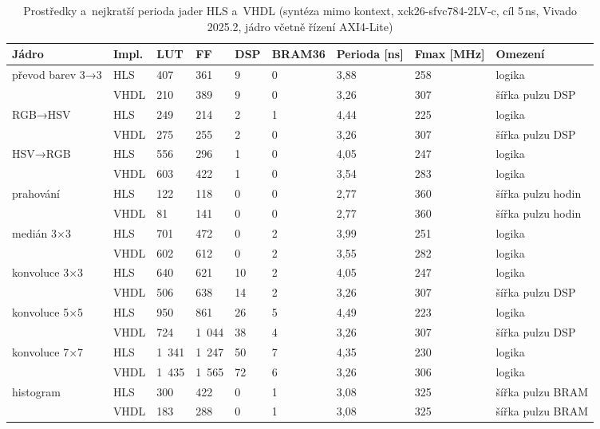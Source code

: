 \begin{table}[htbp]
    \centering
    \caption{Prostředky a~nejkratší perioda jader HLS a~VHDL (syntéza mimo kontext, xck26-sfvc784-2LV-c, cíl 5\,ns, Vivado 2025.2, jádro včetně řízení AXI4-Lite)}
    \label{tab:ooc}
    \begin{tabular}{p{2.6cm}p{1.2cm}p{1.1cm}p{1.1cm}p{1.0cm}p{1.2cm}p{1.4cm}p{1.3cm}p{2.8cm}}
        \toprule
        Jádro & Impl. & LUT & FF & DSP & BRAM36 & Perioda [ns] & Fmax [MHz] & Omezení \\
        \midrule
        převod barev 3→3 & HLS & 407 & 361 & 9 & 0 & 3,88 & 258 & logika \\
         & VHDL & 210 & 389 & 9 & 0 & 3,26 & 307 & šířka pulzu DSP \\
        RGB→HSV & HLS & 249 & 214 & 2 & 1 & 4,44 & 225 & logika \\
         & VHDL & 275 & 255 & 2 & 0 & 3,26 & 307 & šířka pulzu DSP \\
        HSV→RGB & HLS & 556 & 296 & 1 & 0 & 4,05 & 247 & logika \\
         & VHDL & 603 & 422 & 1 & 0 & 3,54 & 283 & logika \\
        prahování & HLS & 122 & 118 & 0 & 0 & 2,77 & 360 & šířka pulzu hodin \\
         & VHDL & 81 & 141 & 0 & 0 & 2,77 & 360 & šířka pulzu hodin \\
        medián 3×3 & HLS & 701 & 472 & 0 & 2 & 3,99 & 251 & logika \\
         & VHDL & 602 & 612 & 0 & 2 & 3,55 & 282 & logika \\
        konvoluce 3×3 & HLS & 640 & 621 & 10 & 2 & 4,05 & 247 & logika \\
         & VHDL & 506 & 638 & 14 & 2 & 3,26 & 307 & šířka pulzu DSP \\
        konvoluce 5×5 & HLS & 950 & 861 & 26 & 5 & 4,49 & 223 & logika \\
         & VHDL & 724 & 1 044 & 38 & 4 & 3,26 & 307 & šířka pulzu DSP \\
        konvoluce 7×7 & HLS & 1 341 & 1 247 & 50 & 7 & 4,35 & 230 & logika \\
         & VHDL & 1 435 & 1 565 & 72 & 6 & 3,26 & 306 & logika \\
        histogram & HLS & 300 & 422 & 0 & 1 & 3,08 & 325 & šířka pulzu BRAM \\
         & VHDL & 183 & 288 & 0 & 1 & 3,08 & 325 & šířka pulzu BRAM \\
        \bottomrule
    \end{tabular}
\end{table}

